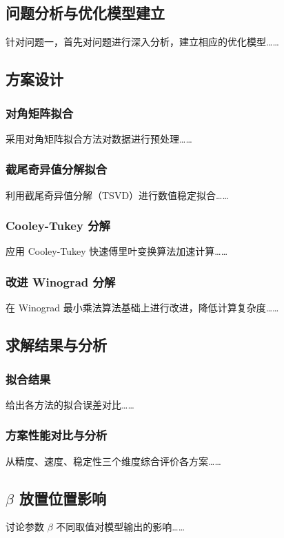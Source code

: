\documentclass[bwprint]{gmcmthesis}
\begin{document}
\subsection{问题分析与优化模型建立}
针对问题一，首先对问题进行深入分析，建立相应的优化模型……

\subsection{方案设计}

\subsubsection{对角矩阵拟合}
采用对角矩阵拟合方法对数据进行预处理……

\subsubsection{截尾奇异值分解拟合}
利用截尾奇异值分解（TSVD）进行数值稳定拟合……

\subsubsection{Cooley-Tukey 分解}
应用 Cooley-Tukey 快速傅里叶变换算法加速计算……

\subsubsection{改进 Winograd 分解}
在 Winograd 最小乘法算法基础上进行改进，降低计算复杂度……

\subsection{求解结果与分析}

\subsubsection{拟合结果}
给出各方法的拟合误差对比……

\subsubsection{方案性能对比与分析}
从精度、速度、稳定性三个维度综合评价各方案……

\subsection{$\beta$ 放置位置影响}
讨论参数 $\beta$ 不同取值对模型输出的影响……
\end{document}

